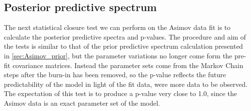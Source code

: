 \subsection{Posterior predictive spectrum}
\label{sec:asimov_pospred}
The next statistical closure test we can perform on the Asimov data fit is to calculate the posterior predictive spectra and p-values. The procedure and aim of the tests is similar to that of the prior predictive spectrum calculation presented in \autoref{sec:Asimov_prior}, but the parameter variations no longer come form the pre-fit covariance matrices. Instead the parameter sets come from the Markov Chain steps after the burn-in has been removed, so the p-value reflects the future predictability of the model in light of the fit data, were more data to be observed. The expectation of this test is to produce a p-value very close to 1.0, since the Asimov data is an exact parameter set of the model.

